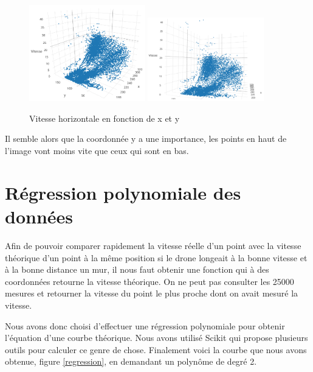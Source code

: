 \documentclass[titlepage,11pt,a4paper]{article}
\begin{document}
\begin{figure}
	\centering
	\caption{\label{vitesses-3d} Vitesse horizontale en fonction de x et y}
	\includegraphics[width=0.45\textwidth]{images/vitesses-3d-apercu.png}
	\hfill
	\includegraphics[width=0.45\textwidth]{images/vitesses-3d-selon-y.png}
\end{figure}

Il semble alors que la coordonnée y a une importance, les points en haut de l'image vont moins vite que ceux qui sont en bas.

\section{Régression polynomiale des données}
Afin de pouvoir comparer rapidement la vitesse réelle d'un point avec la vitesse théorique d'un point à la même position si le drone longeait à la bonne vitesse et à la bonne distance un mur, il nous faut obtenir une fonction qui à des coordonnées retourne la vitesse théorique. On ne peut pas consulter les \num{25000} mesures et retourner la vitesse du point le plus proche dont on avait mesuré la vitesse.

Nous avons donc choisi d'effectuer une régression polynomiale pour obtenir l'équation d'une courbe \og{}théorique\fg{}. Nous avons utilisé Scikit qui propose plusieurs outils pour calculer ce genre de chose. Finalement voici la courbe que nous avons obtenue, figure \vref{regression}, en demandant un polynôme de degré 2.
\end{document}
